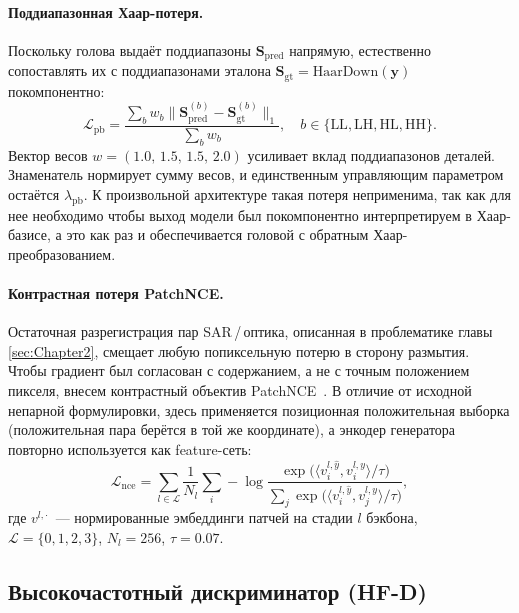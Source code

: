 \paragraph{Поддиапазонная Хаар-потеря.}
Поскольку голова выдаёт поддиапазоны $\mathbf{S}_{\text{pred}}$ напрямую,
естественно сопоставлять их с поддиапазонами эталона
$\mathbf{S}_{\text{gt}}=\mathrm{HaarDown}(\mathbf{y})$ покомпонентно:
\begin{equation}
  \mathcal{L}_{\text{pb}}=\frac{\sum_{b}w_{b}\bigl\|
                              \mathbf{S}_{\text{pred}}^{(b)}-
                              \mathbf{S}_{\text{gt}}^{(b)}\bigr\|_{1}}
                              {\sum_{b}w_{b}},\quad
  b\in\{\text{LL},\text{LH},\text{HL},\text{HH}\}.
\end{equation}
Вектор весов $w=(1.0,\,1.5,\,1.5,\,2.0)$ усиливает вклад поддиапазонов деталей.
Знаменатель нормирует сумму весов, и единственным управляющим параметром остаётся
$\lambda_{\text{pb}}$. К произвольной архитектуре такая потеря неприменима, так как
для нее необходимо чтобы выход модели был покомпонентно интерпретируем в Хаар-базисе,
а это как раз и обеспечивается головой с обратным Хаар-преобразованием.

\paragraph{Контрастная потеря PatchNCE.}
Остаточная разрегистрация пар SAR\,/\,оптика, описанная в проблематике главы \ref{sec:Chapter2}, смещает любую попиксельную потерю в
сторону размытия. Чтобы градиент был согласован с содержанием, а
не с точным положением пикселя, внесем контрастный объектив
PatchNCE~\cite{park2020cut}. В отличие от исходной непарной формулировки,
здесь применяется позиционная положительная выборка (положительная пара берётся в
той же координате), а энкодер генератора повторно используется как feature-сеть:
\begin{equation}
  \mathcal{L}_{\text{nce}}=\sum_{l\in\mathcal{L}}\frac{1}{N_{l}}\sum_{i}
    -\log\frac{\exp\bigl(\langle v_{i}^{l,\hat{y}},v_{i}^{l,y}\rangle/\tau\bigr)}
              {\sum_{j}\exp\bigl(\langle v_{i}^{l,\hat{y}},v_{j}^{l,y}\rangle/\tau\bigr)},
\end{equation}
где $v^{l,\cdot}$~--- нормированные эмбеддинги патчей на стадии $l$ бэкбона,
$\mathcal{L}=\{0,1,2,3\}$, $N_{l}=256$, $\tau=0.07$.

\subsection{Высокочастотный дискриминатор (HF-D)}
\label{subsec:hfd}

